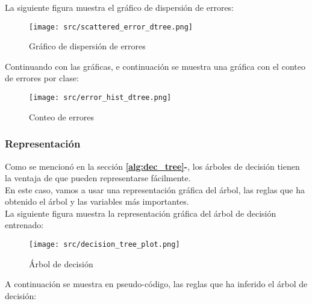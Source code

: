 La siguiente figura muestra el gráfico de dispersión de errores:
 \begin{figure}[!htbp]
	\centering
	\texttt{[image: src/scattered\_error\_dtree.png]}
	\caption{Gráfico de dispersión de errores}
	\label{fig:tree_scattered}
\end{figure}
Continuando con las gráficas, e continuación se muestra una gráfica con el conteo de errores por clase:
 \begin{figure}[!htbp]
	\centering
	\texttt{[image: src/error\_hist\_dtree.png]}
	\caption{Conteo de errores}
	\label{fig:tree_error_plot}
\end{figure}
\subsubsection{Representación}
Como se mencionó en la sección \textbf{\ref{alg:dec_tree}-}, los árboles de decisión tienen la ventaja de que pueden representarse fácilmente. \\
En este caso, vamos a usar una representación gráfica del árbol, las reglas que ha obtenido el árbol y las variables más importantes.\\
\linebreak
La siguiente figura muestra la representación gráfica del árbol de decisión entrenado:\\
\linebreak
 \begin{figure}[!htbp]
	\centering
	\texttt{[image: src/decision\_tree\_plot.png]}
	\caption{Árbol de decisión}
	\label{fig:decission_tree1}
\end{figure}
\linebreak
A continuación se muestra en pseudo-código, las reglas que ha inferido el árbol de decisión:\\


